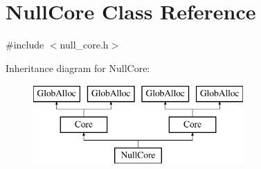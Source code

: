 \hypertarget{classNullCore}{\section{Null\-Core Class Reference}
\label{classNullCore}
}


{\ttfamily \#include $<$null\-\_\-core.\-h$>$}

Inheritance diagram for Null\-Core\-:\begin{figure}[H]
\begin{center}
\leavevmode
\includegraphics[height=3.000000cm]{classNullCore}
\end{center}
\end{figure}
